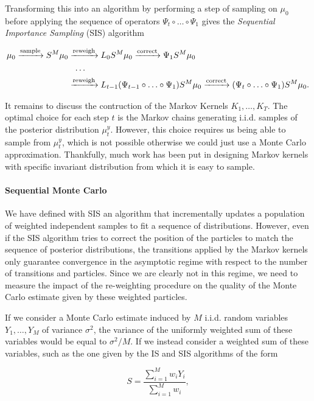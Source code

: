 Transforming this into an algorithm by performing a step of sampling on $\mu_0$ before applying the sequence of operators $\Psi_t \circ \ldots \circ \Psi_1$ gives the \textit{Sequential Importance Sampling} (SIS) algorithm

\begin{align*}
  \mu_0 \xrightarrow{\text{sample}} S^M\mu_0
  &\xrightarrow{\text{reweigh}} L_0S^M\mu_0 \xrightarrow{\text{correct}} \Psi_1S^M\mu_0\\
  &\ \ \ldots\\
  &\xrightarrow{\text{reweigh}} L_{t-1}(\Psi_{t-1} \circ \ldots \circ \Psi_1)S^M\mu_0 \xrightarrow{\text{correct}} (\Psi_t \circ \ldots \circ \Psi_1)S^M\mu_0.
\end{align*}

It remains to discuss the contruction of the Markov Kernels $K_1, \ldots, K_T$. The optimal choice for each step $t$ is the Markov chains generating i.i.d. samples of the posterior distribution $\mu^y_t$. However, this choice requires us being able to sample from $\mu^y_t$, which is not possible otherwise we could just use a Monte Carlo approximation. Thankfully, much work has been put in designing Markov kernels with specific invariant distribution from which it is easy to sample.

\paragraph{Sequential Monte Carlo} We have defined with SIS an algorithm that incrementally updates a population of weighted independent samples to fit a sequence of distributions. However, even if the SIS algorithm tries to correct the position of the particles to match the sequence of posterior distributions, the transitions applied by the Markov kernels only guarantee convergence in the asymptotic regime with respect to the number of transitions and particles. Since we are clearly not in this regime, we need to measure the impact of the re-weighting  procedure on the quality of the Monte Carlo estimate given by these weighted particles.

If we consider a Monte Carlo estimate induced by $M$ i.i.d. random variables $Y_1, \ldots, Y_M$ of variance $\sigma^2$, the variance of the uniformly weighted sum of these variables would be equal to $\sigma^2/M$. If we instead consider a weighted sum of these variables, such as the one given by the IS and SIS algorithms of the form

\begin{equation}\label{sum-s}
  S = \frac{\sum_{i=1}^Mw_iY_i}{\sum_{i=1}^Mw_i},
\end{equation}

